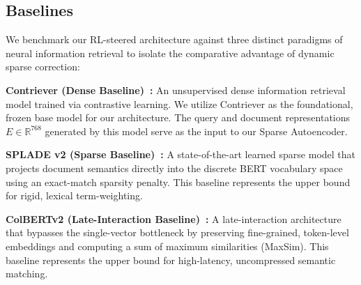 \begin{table}[htbp]
    \caption{Benchmark Dataset Statistics}
    \begin{center}
    \end{center}
    \label{tab:datasets}
\end{table}

\subsection{Baselines}
We benchmark our RL-steered architecture against three distinct paradigms of neural information retrieval to isolate the comparative advantage of dynamic sparse correction:

\textbf{Contriever (Dense Baseline)~\citep{izacard2022}:} An unsupervised dense information retrieval model trained via contrastive learning. We utilize Contriever as the foundational, frozen base model for our architecture. The query and document representations $E \in \mathbb{R}^{768}$ generated by this model serve as the input to our Sparse Autoencoder.

\textbf{SPLADE v2 (Sparse Baseline)~\citep{formal2021spladev2}:} A state-of-the-art learned sparse model that projects document semantics directly into the discrete BERT vocabulary space using an exact-match sparsity penalty. This baseline represents the upper bound for rigid, lexical term-weighting.

\textbf{ColBERTv2 (Late-Interaction Baseline)~\citep{santhanam2022}:} A late-interaction architecture that bypasses the single-vector bottleneck by preserving fine-grained, token-level embeddings and computing a sum of maximum similarities (MaxSim). This baseline represents the upper bound for high-latency, uncompressed semantic matching.

